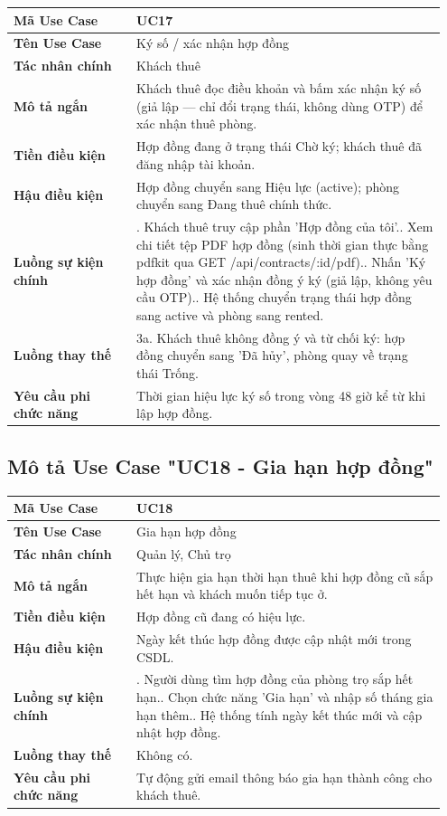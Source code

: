 \begin{longtable}[]{@{}>{\RaggedRight\arraybackslash}p{0.27\linewidth}>{\RaggedRight\arraybackslash}p{0.68\linewidth}@{}}
\toprule
\textbf{Mã Use Case} & UC17\tabularnewline
\midrule
\endhead
\textbf{Tên Use Case} & Ký số / xác nhận hợp đồng\tabularnewline
\textbf{Tác nhân chính} & Khách thuê\tabularnewline
\textbf{Mô tả ngắn} & Khách thuê đọc điều khoản và bấm xác nhận ký số
(giả lập --- chỉ đổi trạng thái, không dùng OTP) để xác nhận thuê
phòng.\tabularnewline
\textbf{Tiền điều kiện} & Hợp đồng đang ở trạng thái Chờ ký; khách thuê
đã đăng nhập tài khoản.\tabularnewline
\textbf{Hậu điều kiện} & Hợp đồng chuyển sang Hiệu lực (active); phòng
chuyển sang Đang thuê chính thức.\tabularnewline
\textbf{Luồng sự kiện chính} & 1. Khách thuê truy cập
phần 'Hợp đồng của tôi'.\newline 2. Xem chi tiết tệp PDF hợp đồng
(sinh thời gian thực bằng pdfkit qua GET
/api/contracts/:id/pdf).\newline 3. Nhấn 'Ký hợp đồng' và xác nhận
đồng ý ký (giả lập, không yêu cầu OTP).\newline 4. Hệ thống chuyển
trạng thái hợp đồng sang active và phòng sang rented.\tabularnewline
\textbf{Luồng thay thế} & 3a. Khách thuê không đồng ý và từ chối ký: hợp
đồng chuyển sang 'Đã hủy', phòng quay về trạng thái
Trống.\tabularnewline
\textbf{Yêu cầu phi chức năng} & Thời gian hiệu lực ký số trong vòng 48
giờ kể từ khi lập hợp đồng.\tabularnewline
\bottomrule
\end{longtable}

\subsection{Mô tả Use Case "UC18 - Gia hạn hợp đồng"}

\begin{longtable}[]{@{}>{\RaggedRight\arraybackslash}p{0.27\linewidth}>{\RaggedRight\arraybackslash}p{0.68\linewidth}@{}}
\toprule
\textbf{Mã Use Case} & UC18\tabularnewline
\midrule
\endhead
\textbf{Tên Use Case} & Gia hạn hợp đồng\tabularnewline
\textbf{Tác nhân chính} & Quản lý, Chủ trọ\tabularnewline
\textbf{Mô tả ngắn} & Thực hiện gia hạn thời hạn thuê khi hợp đồng cũ
sắp hết hạn và khách muốn tiếp tục ở.\tabularnewline
\textbf{Tiền điều kiện} & Hợp đồng cũ đang có hiệu lực.\tabularnewline
\textbf{Hậu điều kiện} & Ngày kết thúc hợp đồng được cập nhật mới trong
CSDL.\tabularnewline
\textbf{Luồng sự kiện chính} & 1. Người dùng tìm hợp
đồng của phòng trọ sắp hết hạn.\newline 2. Chọn chức năng 'Gia hạn'
và nhập số tháng gia hạn thêm.\newline 3. Hệ thống tính ngày kết
thúc mới và cập nhật hợp đồng.\tabularnewline
\textbf{Luồng thay thế} & Không có.\tabularnewline
\textbf{Yêu cầu phi chức năng} & Tự động gửi email thông báo gia hạn
thành công cho khách thuê.\tabularnewline
\bottomrule
\end{longtable}

